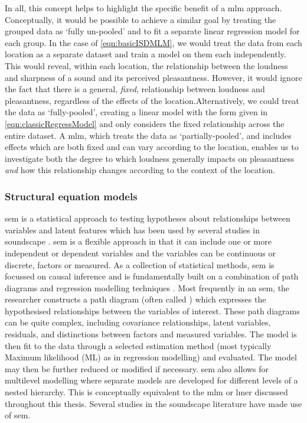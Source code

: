 In all, this concept helps to highlight the specific benefit of a \gls{mlm} approach. Conceptually, it would be possible to achieve a similar goal by treating the grouped data as `fully un-pooled' and to fit a separate linear regression model for each group. In the case of \cref{eqn:basicISDMLM}, we would treat the data from each location as a separate dataset and train a model on them each independently. This would reveal, within each location, the relationship between the loudness and sharpness of a sound and its perceived pleasantness. However, it would ignore the fact that there is a general, \emph{fixed}, relationship between loudness and pleasantness, regardless of the effects of the location.Alternatively, we could treat the data as `fully-pooled', creating a linear model with the form given in \cref{eqn:classicRegressModel} and only considers the fixed relationship across the entire dataset. A \gls{mlm}, which treats the data as `partially-pooled', and includes effects which are both fixed and can vary according to the location, enables us to investigate both the degree to which loudness generally impacts on pleasantness \emph{and} how this relationship changes according to the context of the location. 

\subsubsection{Structural equation models}

\gls{sem} is a statistical approach to testing hypotheses about relationships between variables and latent features which has been used by several studies in soundscape \citep{Tarlao2020Investigating,Hong2015Influence,Torresin2022Indoor}. \gls{sem} is a flexible approach in that it can include one or more independent or dependent variables and the variables can be continuous or discrete, factors or measured. As a collection of statistical methods, \gls{sem} is focussed on causal inference and is fundamentally built on a combination of path diagrams and regression modelling techniques \citep{Ullman2012Structural}. Most frequently in an \gls{sem}, the researcher constructs a path diagram (often called ) which expresses the hypothesised relationships between the variables of interest. These path diagrams can be quite complex, including covariance relationships, latent variables, residuals, and distinctions between factors and measured variables. The model is then fit to the data through a selected estimation method (most typically Maximum likelihood (ML) as in regression modelling) and evaluated. The model may then be further reduced or modified if necessary. \gls{sem} also allows for multilevel modelling where separate models are developed for different levels of a nested hierarchy. This is conceptually equivalent to the \gls{mlm} or \gls{lmer} discussed throughout this thesis. Several studies in the soundscape literature have made use of \gls{sem}. 


